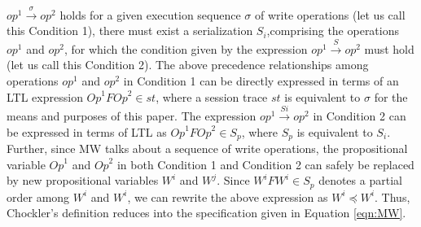 \documentclass{sig-alternate-05-2015}
\begin{document}
  $\mathit{op}^1 \xrightarrow{\sigma} \mathit{op}^2$ holds for a given execution sequence $\sigma$ of write operations
  (let us call this Condition 1), there must exist a serialization ${S_i}$,comprising the
   operations $\mathit{op}^1$ and $\mathit{op}^2$, for which the condition given by the expression
  $\mathit{op}^1 \xrightarrow{S} \mathit{op}^2$ must hold (let us call this Condition 2).
  The above precedence relationships among operations $\mathit{op}^1$ and $\mathit{op}^2$ in Condition 1 can be directly
  expressed in terms of an LTL expression
    $\mathit{Op}^1 F \mathit{Op}^2 \in \mathit{st}$, where a session trace $\mathit{st}$ is equivalent to $\sigma$ for the
    means and purposes of this paper.
   The expression $\mathit{op}^1 \xrightarrow{Si} \mathit{op}^2$ in Condition 2
  can be expressed in terms of LTL as $\mathit{Op}^1 F \mathit{Op}^2 \in S_p$,  where
  $S_p$ is equivalent to $S_i$.  Further,
   since MW talks about a sequence of write operations, the propositional variable
   $\mathit{Op}^1$ and   $\mathit{Op}^2$ in both Condition 1 and Condition 2 can safely be  replaced  by new
   propositional variables  $W^i$ and $W^j$. Since $W^i  F W^i  \in S_p$ denotes a partial order among $W^i$ and $W^i$, we can rewrite the above expression as  $W^i  \preccurlyeq W^i$. Thus, Chockler's definition reduces into the specification given in Equation \ref{eqn:MW}. 
\end{document}
